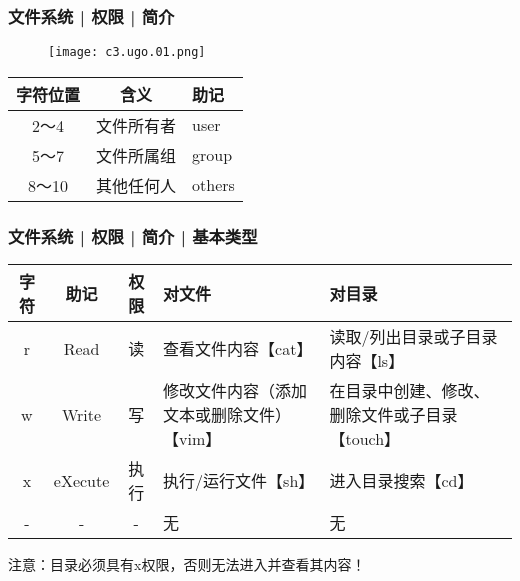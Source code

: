 \begin{frame}
  \frametitle{文件系统 | 权限 | \alert{简介}}
  \begin{figure}
    \centering
    \texttt{[image: c3.ugo.01.png]}
  \end{figure}
  \begin{table}
    \centering
    \begin{tabular}{ccl}
      \hline
      \rowcolor{blue!50}字符位置 & 含义 & 助记\\
      \hline
      2～4 & 文件所有者 & user\\
      5～7 & 文件所属组 & group\\
      8～10 & 其他任何人 & others\\
      \hline
    \end{tabular}
  \end{table}
\end{frame}

\begin{frame}
  \frametitle{文件系统 | 权限 | 简介 | \alert{基本类型}}
  \begin{table}
    \centering
    \begin{tabularx}{\textwidth}{cccXX}
      \hline
      \rowcolor{blue!50}字符 & 助记 & 权限 & 对文件 & 对目录\\
      \hline
      r & Read & 读 & 查看文件内容【cat】 & 读取/列出目录或子目录内容【ls】\\
      w & Write & 写 & 修改文件内容（添加文本或删除文件）【vim】 & 在目录中创建、修改、删除文件或子目录【touch】\\
      x & eXecute & 执行 & 执行/运行文件【sh】 & 进入目录搜索【cd】\\
      - & - & - & 无 & 无\\
      \hline
    \end{tabularx}
  \end{table}
  \centering
  注意：目录必须具有x权限，否则无法进入并查看其内容！
\end{frame}

